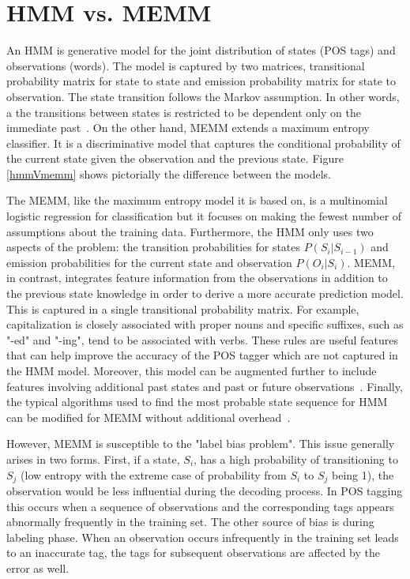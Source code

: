\section{HMM vs. MEMM}
\label{sec:comparison}

An HMM is generative model for the joint distribution of states (POS tags) and observations (words). The model is captured by two matrices, transitional probability matrix for state to state and emission probability matrix for state to observation. The state transition follows the Markov assumption. In other words, a the transitions between states is restricted to be dependent only on the immediate past~\cite{nlpBook}. On the other hand, MEMM extends a maximum entropy classifier. It is a discriminative model that captures the conditional probability of the current state given the observation and the previous state. Figure \ref{hmmVmemm} shows pictorially the difference between the models.

The MEMM, like the maximum entropy model it is based on, is a multinomial logistic regression for classification but it focuses on making the fewest number of assumptions about the training data. Furthermore, the HMM only uses two aspects of the problem: the transition probabilities for states $P( S_i | S_{i-1} )$ and emission probabilities for the current state and observation $P( O_i | S_i )$. MEMM, in contrast, integrates feature information from the observations in addition to the previous state knowledge in order to derive a more accurate prediction model. This is captured in a single transitional probability matrix. For example, capitalization is closely associated with proper nouns and specific suffixes, such as "-ed" and "-ing", tend to be associated with verbs. These rules are useful features that can help improve the accuracy of the POS tagger which are not captured in the HMM model. Moreover, this model can be augmented further to include features involving additional past states and past or future observations~\cite{nlpBook}. Finally, the typical algorithms used to find the most probable state sequence for HMM can be modified for MEMM without additional overhead~\cite{memmPaper}.

However, MEMM is susceptible to the "label bias problem". This issue generally arises in two forms. First, if a state, $S_i$, has a high probability of transitioning to $S_j$ (low entropy with the extreme case of probability from $S_i$ to $S_j$ being 1), the observation would be less influential during the decoding process. In POS tagging this occurs when a sequence of observations and the corresponding tags appears abnormally frequently in the training set. The other source of bias is during labeling phase. When an observation occurs infrequently in the training set leads to an inaccurate tag, the tags for subsequent observations are affected by the error as well. \cite{labelBiasProblem}


